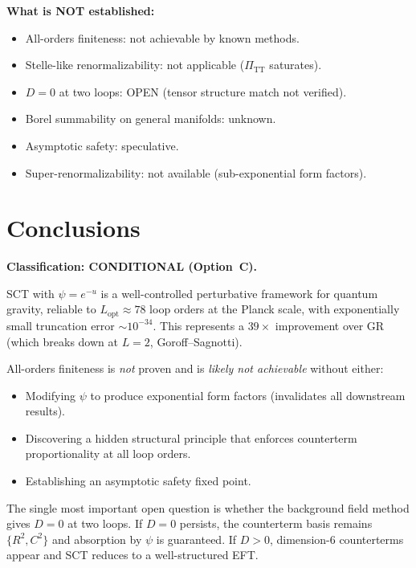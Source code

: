 \documentclass[12pt,a4paper]{article}
\begin{document}
\textbf{What is NOT established:}
\begin{itemize}
  \item All-orders finiteness: not achievable by known methods.
  \item Stelle-like renormalizability: not applicable ($\Pi_{\mathrm{TT}}$ saturates).
  \item $D = 0$ at two loops: OPEN (tensor structure match not verified).
  \item Borel summability on general manifolds: unknown.
  \item Asymptotic safety: speculative.
  \item Super-renormalizability: not available (sub-exponential form factors).
\end{itemize}

\section{Conclusions}
\label{sec:conclusions}

\textbf{Classification: CONDITIONAL (Option~C).}

SCT with $\psi = e^{-u}$ is a well-controlled perturbative framework for
quantum gravity, reliable to $L_{\mathrm{opt}} \approx 78$ loop orders at
the Planck scale, with exponentially small truncation error
$\sim 10^{-34}$. This represents a $39\times$ improvement over GR
(which breaks down at $L = 2$, Goroff--Sagnotti).

All-orders finiteness is \emph{not} proven and is \emph{likely not achievable}
without either:
\begin{itemize}
  \item Modifying $\psi$ to produce exponential form factors (invalidates
    all downstream results).
  \item Discovering a hidden structural principle that enforces counterterm
    proportionality at all loop orders.
  \item Establishing an asymptotic safety fixed point.
\end{itemize}

The single most important open question is whether the background field method
gives $D = 0$ at two loops. If $D = 0$ persists, the counterterm basis remains
$\{R^2, C^2\}$ and absorption by $\psi$ is guaranteed. If $D > 0$,
dimension-6 counterterms appear and SCT reduces to a well-structured EFT.
\end{document}
